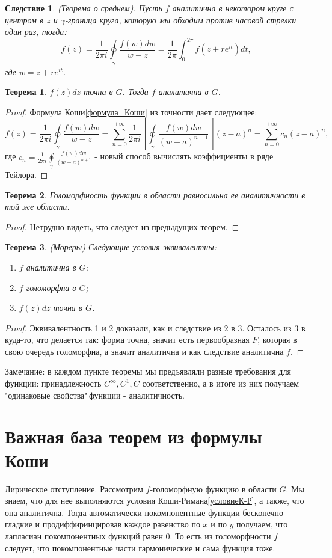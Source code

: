 \documentclass[12pt,a4paper]{article} %
\newtheorem{theorem}{Теорема}
\newtheorem{consequence}{Следствие}
\begin{document}
	\begin{consequence}
		(Теорема о среднем). Пусть $f$ аналитична в некотором круге с центром в $z$ и $\gamma$-граница круга, которую мы обходим против часовой стрелки один раз, тогда:
		$$f(z)=\frac{1}{2\pi i}\displaystyle\oint\limits_{\gamma}\frac{f(w)dw}{w-z}=\frac{1}{2\pi}\int_0^{2\pi}f(z+re^{it})dt,$$
		где $w=z+re^{it}$.
	\end{consequence}
	\begin{theorem}
		$f(z)dz$ точна в $G$. Тогда $f$ аналитична в $G$.
	\end{theorem}
	\begin{proof}
		Формула Коши\eqref{формула_Коши} из точности дает следующее:
		$$f(z)=\frac{1}{2\pi i}\oint\limits_{\gamma}\frac{f(w)dw}{w-z}=\sum_{n=0}^{+\infty}\frac{1}{2\pi i}\left[\oint\limits_{\gamma}\frac{f(w)dw}{(w-a)^{n+1}}\right](z-a)^n=\sum_{n=0}^{+\infty}c_n (z-a)^n,$$
		где $c_n=\displaystyle\frac{1}{2\pi i}\displaystyle\oint\limits_{\gamma}\frac{f(w)dw}{(w-a)^{n+1}}$ - новый способ вычислять коэффициенты в ряде Тейлора.
	\end{proof}
	\begin{theorem}
		Голоморфность функции в области равносильна ее аналитичности в той же области.
	\end{theorem}
	\begin{proof}
		Нетрудно видеть, что следует из предыдущих теорем.
	\end{proof}
	\begin{theorem}
		(Мореры) Следующие условия эквивалентны:
		\begin{enumerate}
			\item $f$ аналитична в $G$;
			\item $f$ голоморфна в $G$;
			\item $f(z)dz$ точна в $G$.
		\end{enumerate}
	\end{theorem}
	\begin{proof}
		Эквивалентность 1 и 2 доказали, как и следствие из 2 в 3. Осталось из 3 в куда-то, что делается так: форма точна, значит есть первообразная $F$, которая в свою очередь голоморфна, а значит аналитична и как следствие аналитична $f$.
	\end{proof}
	Замечание: в каждом пункте теоремы мы предъявляли разные требования для функции: принадлежность $C^{\infty}, C^1, C$ соответственно, а в итоге из них получаем "одинаковые свойства"\,функции - аналитичность.
	\section{Важная база теорем из формулы Коши}
	Лирическое отступление. Рассмотрим $f$-голоморфную функцию в области $G$. Мы знаем, что для нее выполняются условия Коши-Римана\eqref{условиеК-Р}, а также, что она аналитична. Тогда автоматически покомпонентные функции бесконечно гладкие и продиффиринцировав каждое равенство по $x$ и по $y$ получаем, что лапласиан покомпонентных функций равен 0. То есть из голоморфности $f$ следует, что покомпонентные части гармонические и сама функция тоже. 
	
\end{document}

